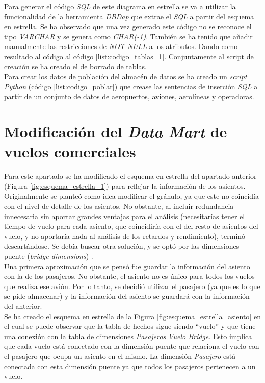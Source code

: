 \documentclass{article}
\begin{document}
Para generar el código \textit{SQL} de este diagrama en estrella se va a utilizar la funcionalidad de la herramienta \textit{DBDap} que extrae el \textit{SQL} a partir del esquema en estrella. Se ha observado que una vez generado este código no se reconoce el tipo \textit{VARCHAR} y se genera como \textit{CHAR(-1)}. También se ha tenido que añadir manualmente las restricciones de \textit{NOT NULL} a los atributos. Dando como resultado al código al código \ref{list:codigo_tablas_1}. Conjuntamente al script de creación se ha creado el de borrado de tablas.\\

Para crear los datos de población del almacén de datos se ha creado un \textit{script Python} (código \ref{list:codigo_poblar}) que crease las sentencias de inserción \textit{SQL} a partir de un conjunto de datos de aeropuertos, aviones, aerolíneas y operadoras.\\


\section{Modificación del \textit{Data Mart} de vuelos comerciales}

Para este apartado se ha modificado el esquema en estrella del apartado anterior (Figura \ref{fig:esquema_estrella_1}) para reflejar la información de los asientos. Originalmente se planteó como idea modificar el gránulo, ya que este no coincidía con el nivel de detalle de los asientos. No obstante, al incluir redundancia innecesaria sin aportar grandes ventajas para el análisis (necesitarías tener el tiempo de vuelo para cada asiento, que coincidiría con el del resto de asientos del vuelo, y no aportaría nada al análisis de los retardos y rendimiento), terminó descartándose. Se debía buscar otra solución, y se optó por las dimensiones puente (\textit{bridge dimensions}) \cite{nuwa:1}.\\

Una primera aproximación que se pensó fue guardar la información del asiento con la de los pasajeros. No obstante, el asiento no es único para todos los vuelos que realiza ese avión. Por lo tanto, se decidió utilizar el pasajero (ya que es lo que se pide almacenar) y la información del asiento se guardará con la información del anterior.\\

Se ha creado el esquema en estrella de la Figura \ref{fig:esquema_estrella_asiento} en el cual se puede observar que la tabla de hechos sigue siendo ``vuelo'' y que tiene una conexión con la tabla de dimensiones \textit{Pasajeros Vuelo Bridge}. Esto implica que cada vuelo está conectado con la dimensión puente que relaciona el vuelo con el pasajero que ocupa un asiento en el mismo. La dimensión \textit{Pasajero} está conectada con esta dimensión puente ya que todos los pasajeros pertenecen a un vuelo.\\
\end{document}
